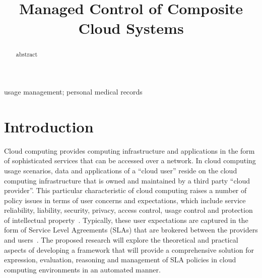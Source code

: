 \documentclass[10pt, conference, compsocconf]{IEEEtran}
\begin{document}
%
\title{Managed Control of Composite Cloud Systems}


\author{
}

\maketitle


\begin{abstract}
abstract
\end{abstract}

\begin{IEEEkeywords}
usage management; personal medical records
\end{IEEEkeywords}

\IEEEpeerreviewmaketitle

\section{Introduction}
Cloud computing provides computing infrastructure and applications in the form of sophisticated services that can be accessed over a network. In cloud computing usage scenarios,  data and applications  of a ``cloud user'' reside on the cloud computing infrastructure that is owned and maintained by a third party ``cloud provider''.  This particular characteristic of cloud computing raises a number of policy issues in terms of user concerns and expectations, which include service reliability, liability, security, privacy, access control, usage control and protection of intellectual property~\cite{JeLiGr:08}.  Typically, these user expectations are captured in the form of Service Level Agreements (SLAs) that are brokered between the providers and users~\cite{BuYeVeBrBr:09}. The proposed research will explore the theoretical and practical aspects of developing a framework that will provide a comprehensive solution for expression, evaluation, reasoning and management of SLA policies in cloud computing environments in an automated manner. 
\end{document}
